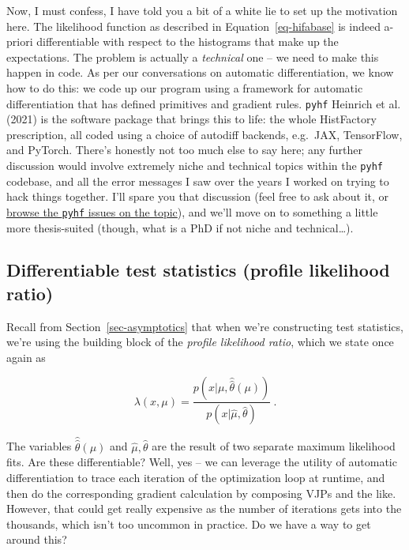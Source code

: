 \documentclass[
  11pt,
  numbers=noendperiod]{book}
\begin{document}
Now, I must confess, I have told you a bit of a white lie to set up the
motivation here. The likelihood function as described in
Equation~\ref{eq-hifabase} is indeed a-priori differentiable with
respect to the histograms that make up the expectations. The problem is
actually a \emph{technical} one -- we need to make this happen in code.
As per our conversations on automatic differentiation, we know how to do
this: we code up our program using a framework for automatic
differentiation that has defined primitives and gradient rules.
\texttt{pyhf} Heinrich et al. (2021) is the software package that brings
this to life: the whole HistFactory prescription, all coded using a
choice of autodiff backends, e.g.~JAX, TensorFlow, and PyTorch. There's
honestly not too much else to say here; any further discussion would
involve extremely niche and technical topics within the \texttt{pyhf}
codebase, and all the error messages I saw over the years I worked on
trying to hack things together. I'll spare you that discussion (feel
free to ask about it, or
\href{https://github.com/scikit-hep/pyhf/issues?q=is\%3Aissue+author\%3Aphinate+}{browse
the \texttt{pyhf} issues on the topic}), and we'll move on to something
a little more thesis-suited (though, what is a PhD if not niche and
technical\ldots).

\hypertarget{differentiable-test-statistics-profile-likelihood-ratio}{%
\subsection{Differentiable test statistics (profile likelihood
ratio)}\label{differentiable-test-statistics-profile-likelihood-ratio}}

Recall from Section~\ref{sec-asymptotics} that when we're constructing
test statistics, we're using the building block of the \emph{profile
likelihood ratio}, which we state once again as

\[
\lambda(x, \mu) = \frac{p\left(x|\mu,\hat{\hat{\theta}}(\mu)\right)}{p\left(x| \hat{\mu}, \hat{\theta}\right)}~.
\]

The variables \(\hat{\hat{\theta}}(\mu)\) and
\(\hat{\mu}, \hat{\theta}\) are the result of two separate maximum
likelihood fits. Are these differentiable? Well, yes -- we can leverage
the utility of automatic differentiation to trace each iteration of the
optimization loop at runtime, and then do the corresponding gradient
calculation by composing VJPs and the like. However, that could get
really expensive as the number of iterations gets into the thousands,
which isn't too uncommon in practice. Do we have a way to get around
this?
\end{document}
